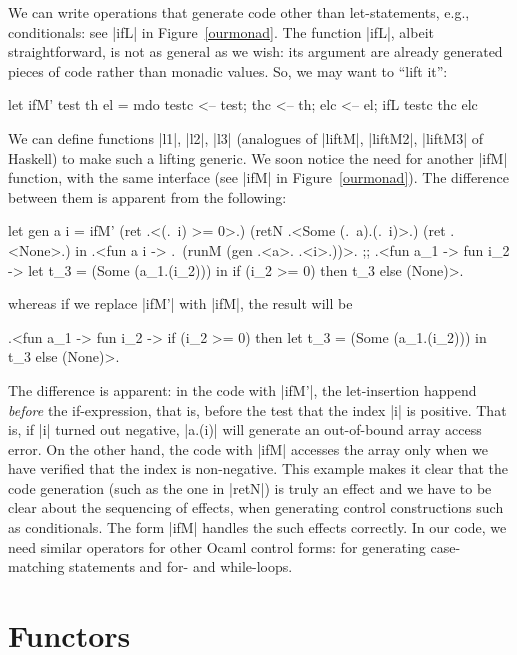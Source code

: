 \documentclass{llncs}
\begin{document}
We can write operations that generate code other than let-statements,
e.g., conditionals: see |ifL| in Figure~\ref{ourmonad}. The function |ifL|, 
albeit straightforward, is not as general as we wish: its argument are
already generated pieces of code rather than monadic values. So, we
may want to ``lift it'':
\begin{code}
let ifM' test th el = mdo {
  testc <-- test;
  thc   <-- th;
  elc   <-- el;
  ifL testc thc elc}
\end{code}

\noindent We can define functions |l1|, |l2|, |l3| (analogues of |liftM|,
|liftM2|, |liftM3| of Haskell) to make such a lifting generic.
We soon notice the need for another |ifM| function, with the same
interface (see |ifM| in Figure~\ref{ourmonad}). The difference between them is
apparent from the following:
\begin{code}
let gen a i = ifM' (ret .<(.~i) >= 0>.) (retN .<Some (.~a).(.~i)>.)
                           (ret .<None>.)
 in .<fun a i -> .~(runM (gen .<a>. .<i>.))>.
;;
.<fun a_1 -> fun i_2 ->
    let t_3 = (Some (a_1.(i_2))) in if (i_2 >= 0) then t_3 else (None)>.
\end{code}
\noindent whereas if we replace |ifM'| with |ifM|, the result will be
\begin{code}
.<fun a_1 -> fun i_2 ->
    if (i_2 >= 0) then let t_3 = (Some (a_1.(i_2))) in t_3 else (None)>.
\end{code}

The difference is apparent: in the code with |ifM'|, the let-insertion
happend \emph{before} the if-expression, that is, before the test that
the index |i| is positive. That is, if |i| turned out
negative, |a.(i)| will generate an out-of-bound array access
error. On the other hand, the code with |ifM| accesses the array only
when we have verified that the index is non-negative. This example
makes it clear that the code generation (such as the one in |retN|) is 
truly an effect and we have to be clear about the sequencing of
effects, when generating control constructions such as conditionals.
The form |ifM| handles the such effects correctly. In our code, we
need similar operators for other Ocaml control forms: for generating
case-matching statements and for- and while-loops.

\section{Functors}\label{functors}
\end{document}
